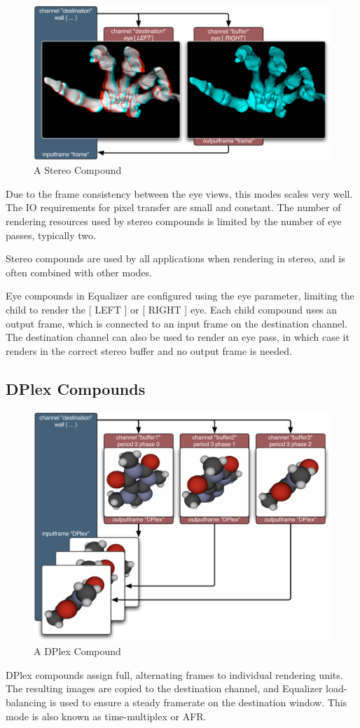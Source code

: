 \documentclass[10pt,a4]{scrartcl}
\begin{document}
\begin{figure}
  \includegraphics[width=.618\textwidth]{images/EYE.pdf}
  {\caption{\label{fStereoCmp}\small A Stereo Compound}}
\end{figure}
Due to the frame consistency between the eye views, this modes scales very
well. The IO requirements for pixel transfer are small and constant. The number
of rendering resources used by stereo compounds is limited by the number of eye
passes, typically two.

Stereo compounds are used by all applications when rendering in stereo,
and is often combined with other modes.

Eye compounds in Equalizer are configured using the \textsf{eye}
parameter, limiting the child to render the \textsf{[ LEFT ]} or
\textsf{[ RIGHT ]} eye. Each child compound uses an output frame, which
is connected to an input frame on the destination channel. The
destination channel can also be used to render an eye pass, in which case
it renders in the correct stereo buffer and no output frame is needed.


\subsection{\label{sDPlex}DPlex Compounds}

\begin{figure}
  \vspace{-2ex}
  \includegraphics[width=.618\textwidth]{images/DPlex.pdf}
  {\caption{ A DPlex Compound}}
\end{figure}
DPlex compounds assign full, alternating frames to individual rendering
units. The resulting images are copied to the destination channel, and
Equalizer load-balancing is used to ensure a steady framerate on the
destination window. This mode is also known as time-multiplex or AFR.
\end{document}
